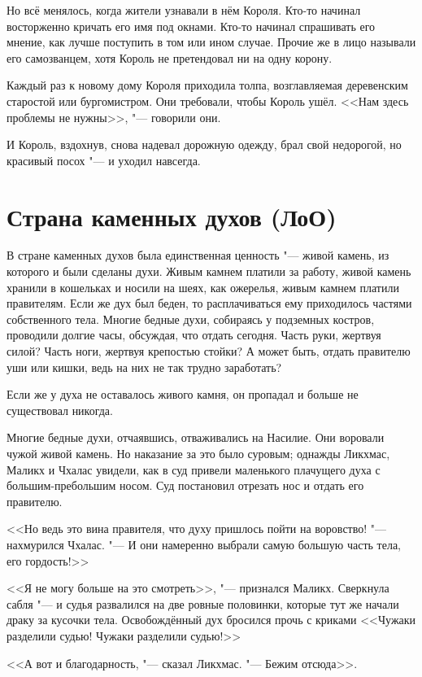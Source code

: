 Но всё менялось, когда жители узнавали в нём Короля.
Кто-то начинал восторженно кричать его имя под окнами.
Кто-то начинал спрашивать его мнение, как лучше поступить в том или ином случае.
Прочие же в лицо называли его самозванцем, хотя Король не претендовал ни на одну корону.

Каждый раз к новому дому Короля приходила толпа, возглавляемая деревенским старостой или бургомистром.
Они требовали, чтобы Король ушёл.
<<Нам здесь проблемы не нужны>>, "--- говорили они.

И Король, вздохнув, снова надевал дорожную одежду, брал свой недорогой, но красивый посох "--- и уходил навсегда.

\section{Страна каменных духов (ЛоО)}

В стране каменных духов была единственная ценность "--- живой камень, из которого и были сделаны духи.
Живым камнем платили за работу, живой камень хранили в кошельках и носили на шеях, как ожерелья, живым камнем платили правителям.
Если же дух был беден, то расплачиваться ему приходилось частями собственного тела.
Многие бедные духи, собираясь у подземных костров, проводили долгие часы, обсуждая, что отдать сегодня.
Часть руки, жертвуя силой?
Часть ноги, жертвуя крепостью стойки?
А может быть, отдать правителю уши или кишки, ведь на них не так трудно заработать?

Если же у духа не оставалось живого камня, он пропадал и больше не существовал никогда.

Многие бедные духи, отчаявшись, отваживались на Насилие.
Они воровали чужой живой камень.
Но наказание за это было суровым;
однажды Ликхмас, Маликх и Чхалас увидели, как в суд привели маленького плачущего духа с большим-пребольшим носом.
Суд постановил отрезать нос и отдать его правителю.

<<Но ведь это вина правителя, что духу пришлось пойти на воровство! "--- нахмурился Чхалас.
"--- И они намеренно выбрали самую большую часть тела, его гордость!>>

<<Я не могу больше на это смотреть>>, "--- признался Маликх.
Сверкнула сабля "--- и судья развалился на две ровные половинки, которые тут же начали драку за кусочки тела.
Освобождённый дух бросился прочь с криками <<Чужаки разделили судью! Чужаки разделили судью!>>

<<А вот и благодарность, "--- сказал Ликхмас.
"--- Бежим отсюда>>.

